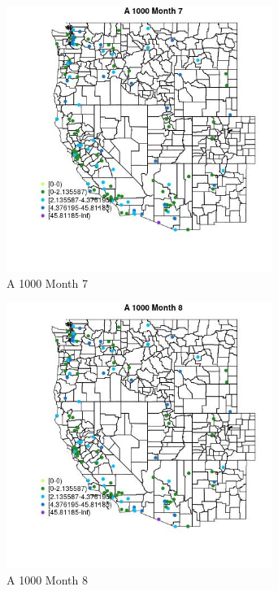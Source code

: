 \begin{figure} 
\centering  
\includegraphics[width=0.77\textwidth]{Code_Outputs/Report_ML_input_PM25_Step4_part_e_de_duplicated_aves_MapObsMo7A_1000.jpg} 
\caption{\label{fig:Report_ML_input_PM25_Step4_part_e_de_duplicated_avesMapObsMo7A_1000}A 1000 Month 7} 
\end{figure} 
 

\begin{figure} 
\centering  
\includegraphics[width=0.77\textwidth]{Code_Outputs/Report_ML_input_PM25_Step4_part_e_de_duplicated_aves_MapObsMo8A_1000.jpg} 
\caption{\label{fig:Report_ML_input_PM25_Step4_part_e_de_duplicated_avesMapObsMo8A_1000}A 1000 Month 8} 
\end{figure} 
 

